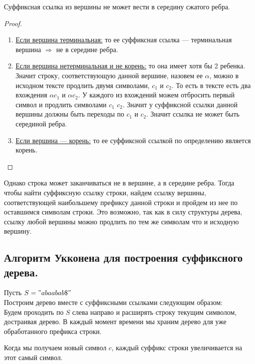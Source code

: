 \begin{prop}
    Суффиксная ссылка из вершины не может вести в середину сжатого ребра. 
\end{prop}

\begin{proof} \ \\
    \begin{enumerate}
        \item \underline{Если вершина терминальная:} 
            то ее суффиксная ссылка --- терминальная вершина $\Rightarrow$ не в середине ребра.

        \item \underline{Если вершина нетерминальная и не корень:}
            то она имеет хотя бы 2 ребенка. Значит строку, соответствующую данной вершине, назовем ее $\alpha$, можно в исходном тексте продлить двумя символами, $c_1$ и $c_2$. 
            То есть в тексте есть два вхождения $\alpha c_1$ и $\alpha c_2$.
            У каждого из вхождений можем отбросить первый символ и продлить символами $c_1$ $c_2$. Значит у суффиксной ссылки данной вершины должны быть переходы по $c_1$ и $c_2$. Значит ссылка не может быть серединой ребра. 

        \item \underline{Если вершина --- корень:} то ее суффиксной ссылкой по определению является корень.
    \end{enumerate}
\end{proof}

Однако строка может заканчиваться не в вершине, а в середине ребра. Тогда чтобы найти суффиксную ссылку строки, найдем ссылку вершины, соответствующей наибольшему префиксу данной строки и пройдем из нее по оставшимся символам строки. Это возможно, так как в силу структуры дерева, ссылку любой вершины можно продлить по тем же символам что и исходную вершину.

\subsection{Алгоритм Укконена для построения суффиксного дерева.}
Пусть $S = "abaabab\$"$\\
Построим дерево вместе с суффиксными ссылками следующим образом: \\
Будем проходить по $S$ слева направо и расширять строку текущим символом, достраивая дерево. 
В каждый момент времени мы храним дерево для уже обработанного префикса строки. 

Когда мы получаем новый символ $c$, каждый суффикс строки увеличивается на этот самый символ. 

